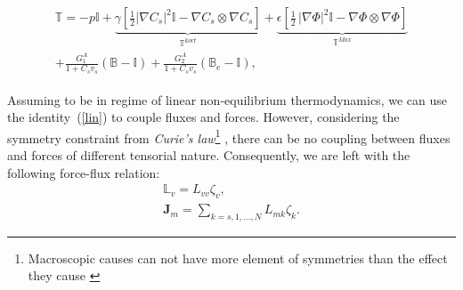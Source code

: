 \documentclass[runningheads]{llncs}
\newcommand{\F}{\ensuremath{\mathbb{F}}}
\newcommand{\LL}{\ensuremath{\mathbb{L}}}
\begin{document}
\begin{gather}
\begin{aligned}
\mathbb{T}= -p \mathbb{I} + \underbrace{\gamma \left[\frac{1}{2} |\nabla C_s|^2\mathbb{I} - \nabla C_s \otimes \nabla C_s\right]}_{\mathbb{T}^{kort}}+ \underbrace{\epsilon \left[\frac{1}{2} \,|\nabla \Phi|^2\mathbb{I} -\nabla \Phi \otimes \nabla \Phi\right]}_{\mathbb{T}^{Max}}\\
+ \frac{G^A_1}{1+C_sv_s}\left(\mathbb{B}-\mathbb{I}\right) + \frac{G^A_2}{1+C_sv_s}\left(\mathbb{B}_e-\mathbb{I}\right),
\end{aligned}
\label{sys3}
\end{gather}

Assuming to be in regime of linear non-equilibrium thermodynamics, we can use the identity~(\ref{lin}) to couple fluxes and forces. However, considering the symmetry constraint from \textit{Curie's law}\footnote{Macroscopic causes can not have more element of symmetries than the effect they cause \cite{CIT}} , there can be no coupling between fluxes and forces of different tensorial nature. Consequently, we are left with the following force-flux relation:
\begin{gather}
\LL_v = L_{vv} \zeta_v,\label{vflow2}\\
\mathbf{J}_m = \sum_{k=s,1,\ldots,N} L_{mk} \zeta_k. \label{dif}
\end{gather}

\end{document}
